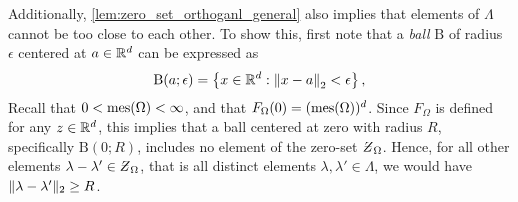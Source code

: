 \documentclass[../thesis.tex]{subfiles}
\begin{document}

\begin{remark}
    Additionally, \cref{lem:zero_set_orthoganl_general} also implies that elements of $\Lambda$ cannot be too close to each other. To show this, first note that a \emph{ball} $\mathrm{B}$ of radius $\epsilon$ centered at $a\in\mathbb{R}^d$ can be expressed as 
    \begin{equation*}
        \mathrm{B}(a ; \epsilon) = \left\{x\in \mathbb{R}^d : \left \|x-a\right \|_2 < \epsilon\right\},
    \end{equation*}
    Recall that $0<\operatorname{mes}(\Omega)<\infty$, and that $F_{\Omega}(0)=(\operatorname{mes}(\Omega))^d $. Since $F_{\Omega}$ is defined for any $z \in \mathbb{R}^d$, this implies that a ball centered at zero with radius $R$, specifically $\mathrm{B}(0; R)$, includes no element of the zero-set $\Zstroke_{\Omega}$. Hence, for all other elements $\lambda-\lambda'\in \Zstroke_{\Omega}$, that is all distinct elements $\lambda,\lambda'\in \Lambda$, we would have $\|\lambda-\lambda'\|_2\geq R$.
\end{remark}
\end{document}

